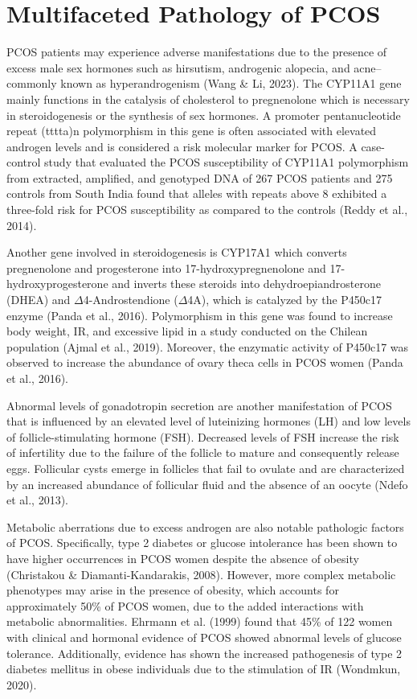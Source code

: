 \section{Multifaceted Pathology of PCOS}

PCOS patients may experience adverse manifestations due to the presence of excess male sex hormones such as hirsutism, androgenic alopecia, and acne–commonly known as hyperandrogenism (Wang \& Li, 2023). The CYP11A1 gene mainly functions in the catalysis of cholesterol to pregnenolone which is necessary in steroidogenesis or the synthesis of sex hormones. A promoter pentanucleotide repeat (tttta)n polymorphism in this gene is often associated with elevated androgen levels and is considered a risk molecular marker for PCOS. A case-control study that evaluated the PCOS susceptibility of CYP11A1 polymorphism from extracted, amplified, and genotyped DNA of 267 PCOS patients and 275 controls from South India found that alleles with repeats above 8 exhibited a three-fold risk for PCOS susceptibility as compared to the controls (Reddy et al., 2014). 

Another gene involved in steroidogenesis is CYP17A1 which converts pregnenolone and progesterone into 17-hydroxypregnenolone and 17-hydroxyprogesterone and inverts these steroids into dehydroepiandrosterone (DHEA) and $\Delta$4-Androstendione ($\Delta$4A), which is catalyzed by the P450c17 enzyme (Panda et al., 2016). Polymorphism in this gene was found to increase body weight, IR, and excessive lipid in a study conducted on the Chilean population (Ajmal et al., 2019). Moreover, the enzymatic activity of P450c17 was observed to increase the abundance of ovary theca cells in PCOS women (Panda et al., 2016).

Abnormal levels of gonadotropin secretion are another manifestation of PCOS that is influenced by an elevated level of luteinizing hormones (LH) and low levels of follicle-stimulating hormone (FSH). Decreased levels of FSH increase the risk of infertility due to the failure of the follicle to mature and consequently release eggs. Follicular cysts emerge in follicles that fail to ovulate and are characterized by an increased abundance of follicular fluid and the absence of an oocyte (Ndefo et al., 2013). 

Metabolic aberrations due to excess androgen are also notable pathologic factors of PCOS. Specifically, type 2 diabetes or glucose intolerance has been shown to have higher occurrences in PCOS women despite the absence of obesity (Christakou \& Diamanti-Kandarakis, 2008). However, more complex metabolic phenotypes may arise in the presence of obesity, which accounts for approximately 50\% of PCOS women, due to the added interactions with metabolic abnormalities. Ehrmann et al. (1999) found that 45\% of 122 women with clinical and hormonal evidence of PCOS showed abnormal levels of glucose tolerance. Additionally, evidence has shown the increased pathogenesis of type 2 diabetes mellitus in obese individuals due to the stimulation of IR (Wondmkun, 2020).

